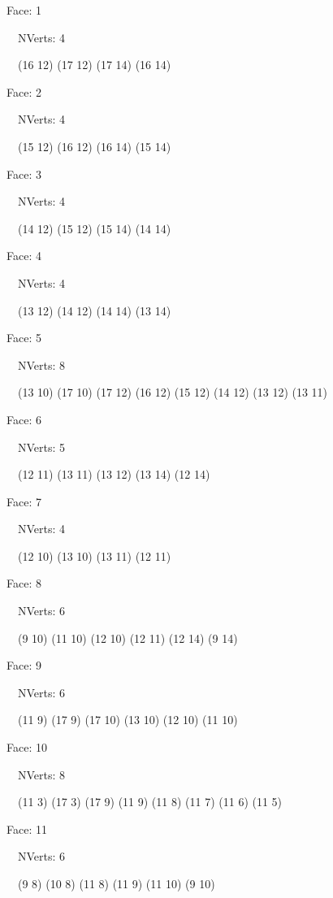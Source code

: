 \documentclass{article}
\begin{document}
{\footnotesize 

Face: 1

\   \    NVerts: 4

 \   \   (16 12) (17 12) (17 14) (16 14)}

{\footnotesize 

Face: 2

\   \    NVerts: 4

 \   \   (15 12) (16 12) (16 14) (15 14)}

{\footnotesize 

Face: 3

\   \    NVerts: 4

 \   \   (14 12) (15 12) (15 14) (14 14)}

{\footnotesize 

Face: 4

\   \    NVerts: 4

 \   \   (13 12) (14 12) (14 14) (13 14)}

{\footnotesize 

Face: 5

\   \    NVerts: 8

 \   \   (13 10) (17 10) (17 12) (16 12) (15 12) (14 12) (13 12) (13 11)}

{\footnotesize 

Face: 6

\   \    NVerts: 5

 \   \   (12 11) (13 11) (13 12) (13 14) (12 14)}

{\footnotesize 

Face: 7

\   \    NVerts: 4

 \   \   (12 10) (13 10) (13 11) (12 11)}

{\footnotesize 

Face: 8

\   \    NVerts: 6

 \   \   (9 10) (11 10) (12 10) (12 11) (12 14) (9 14)}

{\footnotesize 

Face: 9

\   \    NVerts: 6

 \   \   (11 9) (17 9) (17 10) (13 10) (12 10) (11 10)}

{\footnotesize 

Face: 10

\   \    NVerts: 8

 \   \   (11 3) (17 3) (17 9) (11 9) (11 8) (11 7) (11 6) (11 5)}

{\footnotesize 

Face: 11

\   \    NVerts: 6

 \   \   (9 8) (10 8) (11 8) (11 9) (11 10) (9 10)}
\end{document}

